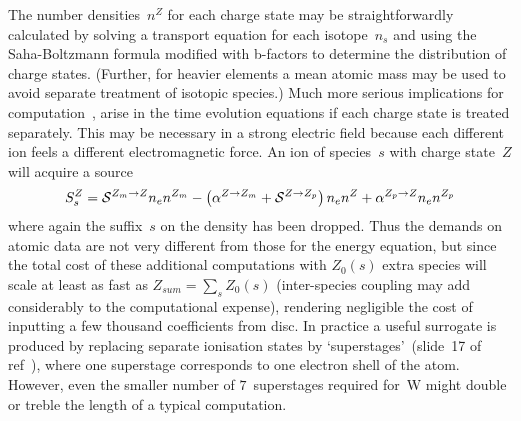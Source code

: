 The number densities~$n^Z$ for each charge state may be straightforwardly calculated by
solving a transport equation for each isotope~$n_s$ and using the Saha-Boltzmann formula modified
with b-factors to determine the distribution of charge states. (Further, for heavier elements
a mean atomic mass may be used to avoid separate treatment of isotopic species.)
Much more serious implications for computation~\cite{omullane},
arise in the time evolution equations if each charge state is treated separately.
This may be necessary in a strong electric field because each different ion feels
a different electromagnetic force.
An ion of species~$s$ with charge state~$Z$ will acquire a source
\begin{equation} \label{eq:nzsource}
S^Z_s=\mathcal{S}^{Z_m\rightarrow Z}n_e n^{Z_m} - \left(\alpha^{Z\rightarrow Z_m}+\mathcal{S}^{Z\rightarrow Z_p}\right) n_e n^Z+
\alpha^{Z_p\rightarrow Z} n_e n^{Z_p}
\end{equation}
where again the suffix~$s$ on the density has been dropped. Thus the demands on atomic data
are not very different from those for the energy equation, but 
since the total cost of these additional computations with $Z_0(s)$ extra species will
scale at least as fast as $Z_{sum}=\sum_s Z_0(s)$ (inter-species coupling may add considerably
to the computational expense), rendering negligible
the cost of inputting a few thousand coefficients from disc. In practice a useful
surrogate is produced by replacing separate ionisation states by `superstages'~(slide~17 of ref~\cite{Su06ADAS}),
where one superstage corresponds to one electron shell of the atom. However, even the smaller number of $7$~superstages
required for~W might double or treble the length of a typical computation.

